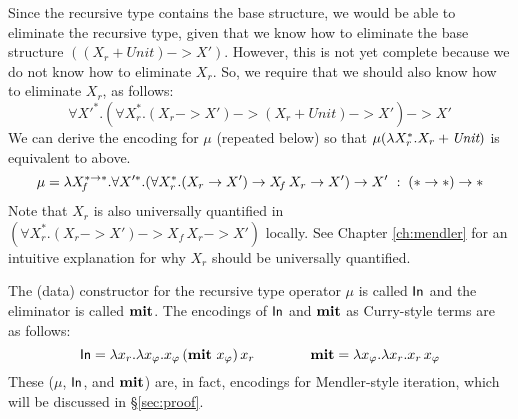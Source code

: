 Since the recursive type contains the base structure, we would be able to
eliminate the recursive type, given that we know how to eliminate
the base structure $((X_r + \textit{Unit}) -> X')$.
However, this is not yet complete because we do not know how to eliminate $X_r$.
So, we require that we should also know how to eliminate $X_r$, as follows:
\[ \forall X'^{*}.
        (\forall X_r^{*}.(X_r -> X') -> (X_r + \textit{Unit}) -> X') -> X' \]
We can derive the encoding for $\mu$ (repeated below)
so that $\mu(\lambda X_r^{*}.X_r + \textit{Unit})$ is equivalent to above.
\[
\mu =
 \lambda X_{\!f}^{* -> *}.
 \forall X'^{*}.(\forall X_r^{*}.(X_r -> X') -> X_{\!f}\,X_r -> X') -> X'
 ~:\; (* -> *) -> *
\]
Note that $X_r$ is also universally quantified
in $(\forall X_r^{*}.(X_r -> X') -> X_{\!f}\,X_r -> X')$
locally.
See Chapter \ref{ch:mendler} %
for an intuitive explanation for why $X_r$ should be universally quantified.

The (data) constructor for the recursive type operator $\mu$ is called $\mathsf{In}$
and the eliminator is called $\mathbf{mit}$. The encodings of $\mathsf{In}$ and $\mathbf{mit}$ as
Curry-style terms are as follows:
\[ \mathsf{In} = \lambda x_r. \lambda x_\varphi.x_\varphi\,(\mathbf{mit}~x_\varphi)\,x_r
\qquad\qquad \mathbf{mit} = \lambda x_\varphi.\lambda x_r.x_r\,x_\varphi \]
These ($\mu$, $\mathsf{In}$, and $\mathbf{mit}$) are, in fact, encodings for
Mendler-style iteration, which will be discussed in \S\ref{sec:proof}.

